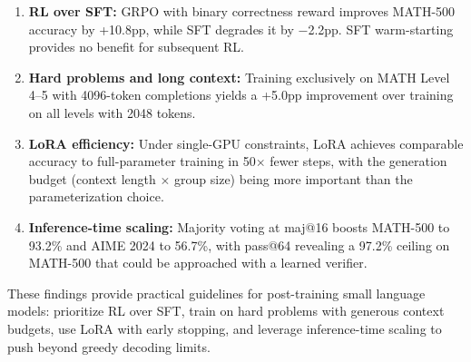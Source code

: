 \documentclass[11pt,a4paper]{article}
\begin{document}
\begin{enumerate}[leftmargin=*]
    \item \textbf{RL over SFT:} GRPO with binary correctness reward improves MATH-500 accuracy by +10.8pp, while SFT degrades it by $-$2.2pp. SFT warm-starting provides no benefit for subsequent RL.

    \item \textbf{Hard problems and long context:} Training exclusively on MATH Level 4--5 with 4096-token completions yields a +5.0pp improvement over training on all levels with 2048 tokens.

    \item \textbf{LoRA efficiency:} Under single-GPU constraints, LoRA achieves comparable accuracy to full-parameter training in 50$\times$ fewer steps, with the generation budget (context length $\times$ group size) being more important than the parameterization choice.

    \item \textbf{Inference-time scaling:} Majority voting at maj@16 boosts MATH-500 to 93.2\% and AIME 2024 to 56.7\%, with pass@64 revealing a 97.2\% ceiling on MATH-500 that could be approached with a learned verifier.
\end{enumerate}

These findings provide practical guidelines for post-training small language models: prioritize RL over SFT, train on hard problems with generous context budgets, use LoRA with early stopping, and leverage inference-time scaling to push beyond greedy decoding limits.


\end{document}
